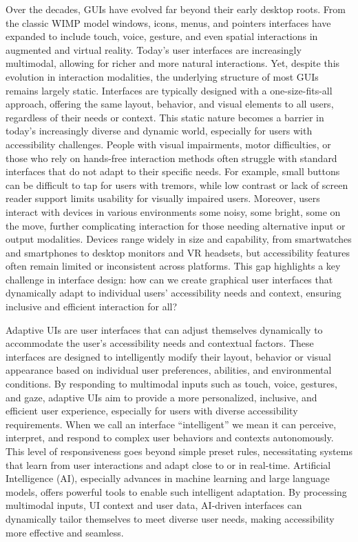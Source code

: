 \documentclass[openany]{book}
\begin{document}
Over the decades, GUIs have evolved far beyond their early desktop roots. From the classic WIMP model windows, icons, menus, and pointers interfaces have expanded to include touch, voice, gesture, and even spatial interactions in augmented and virtual reality. Today’s user interfaces are increasingly multimodal, allowing for richer and more natural interactions.
Yet, despite this evolution in interaction modalities, the underlying structure of most GUIs remains largely static. Interfaces are typically designed with a one-size-fits-all approach, offering the same layout, behavior, and visual elements to all users, regardless of their needs or context. This static nature becomes a barrier in today’s increasingly diverse and dynamic world, especially for users with accessibility challenges. People with visual impairments, motor difficulties, or those who rely on hands-free interaction methods often struggle with standard interfaces that do not adapt to their specific needs. 
For example, small buttons can be difficult to tap for users with tremors, while low contrast or lack of screen reader support limits usability for visually impaired users.
Moreover, users interact with devices in various environments some noisy, some bright, some on the move, further complicating interaction for those needing alternative input or output modalities. Devices range widely in size and capability, from smartwatches and smartphones to desktop monitors and VR headsets, but accessibility features often remain limited or inconsistent across platforms. This gap highlights a key challenge in interface design: how can we create graphical user interfaces that dynamically adapt to individual users’ accessibility needs and context, ensuring inclusive and efficient interaction for all?

Adaptive UIs are user interfaces that can adjust themselves dynamically to accommodate the user’s accessibility needs and contextual factors. These interfaces are designed to intelligently modify their layout, behavior or visual appearance based on individual user preferences, abilities, and environmental conditions. By responding to multimodal inputs such as touch, voice, gestures, and gaze, adaptive UIs aim to provide a more personalized, inclusive, and efficient user experience, especially for users with diverse accessibility requirements. When we call an interface “intelligent” we mean it can perceive, interpret, and respond to complex user behaviors and contexts autonomously. This level of responsiveness goes beyond simple preset rules, necessitating systems that learn from user interactions and adapt close to or in real-time. Artificial Intelligence (AI), especially advances in machine learning and large language models, offers powerful tools to enable such intelligent adaptation. By processing multimodal inputs, UI context and user data, AI-driven interfaces can dynamically tailor themselves to meet diverse user needs, making accessibility more effective and seamless.
\end{document}
